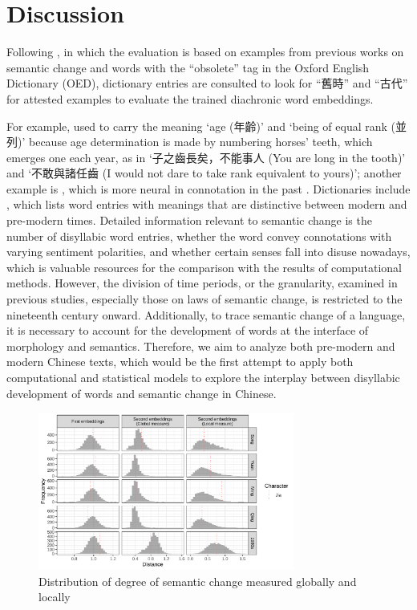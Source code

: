 

\section{Discussion}
Following \textcite{hamilton2016law}, in which the evaluation is based on examples from previous works on semantic change and words with the ``obsolete'' tag in the Oxford English Dictionary (OED), dictionary entries are consulted to look for ``舊時'' and ``古代'' for attested examples to evaluate the trained diachronic word embeddings.

For example,  used to carry the meaning `age (年齡)' and `being of equal rank (並列)' because age determination is made by numbering horses' teeth, which emerges one each year, as in `子之齒長矣，不能事人 (You are long in the tooth)' and `不敢與諸任齒 (I would not dare to take rank equivalent to yours)'; another example is , which is more neural in connotation in the past \parencite[前言]{wang1997gujinyiyi}. Dictionaries include \textcite{wang1997gujinyiyi,liu1992gujinyi}, which lists word entries with meanings that are distinctive between modern and pre-modern times. Detailed information relevant to semantic change is the number of disyllabic word entries, whether the word convey connotations with varying sentiment polarities, and whether certain senses fall into disuse nowadays, which is valuable resources for the comparison with the results of computational methods. However, the division of time periods, or the granularity, examined in previous studies, especially those on laws of semantic change, is restricted to the nineteenth century onward. Additionally, to trace semantic change of a language, it is necessary to account for the development of words at the interface of morphology and semantics. Therefore, we aim to analyze both pre-modern and modern Chinese texts, which would be the first attempt to apply both computational and statistical models to explore the interplay between disyllabic development of words and semantic change in Chinese.

\begin{figure}[H]
  \centering
  \includegraphics[width=0.75\textwidth,keepaspectratio]{figures_new/measures/dist_hist_w5.pdf}
  \caption{Distribution of degree of semantic change measured globally and locally}
\end{figure}

